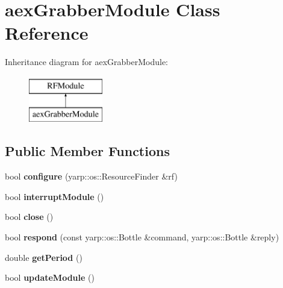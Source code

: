 \hypertarget{classaexGrabberModule}{\section{aex\-Grabber\-Module Class Reference}
\label{classaexGrabberModule}
}
Inheritance diagram for aex\-Grabber\-Module\-:\begin{figure}[H]
\begin{center}
\leavevmode
\includegraphics[height=2.000000cm]{classaexGrabberModule}
\end{center}
\end{figure}
\subsection*{Public Member Functions}
\begin{DoxyCompactItemize}
\item 
\hypertarget{classaexGrabberModule_a7654bd490ccdd31ffc5de4e5d85789f3}{bool {\bfseries configure} (yarp\-::os\-::\-Resource\-Finder \&rf)}\label{classaexGrabberModule_a7654bd490ccdd31ffc5de4e5d85789f3}

\item 
\hypertarget{classaexGrabberModule_a349f07e43758979d9f7e520dd25ba868}{bool {\bfseries interrupt\-Module} ()}\label{classaexGrabberModule_a349f07e43758979d9f7e520dd25ba868}

\item 
\hypertarget{classaexGrabberModule_ac032595742ec7bfdd3d6788436572aca}{bool {\bfseries close} ()}\label{classaexGrabberModule_ac032595742ec7bfdd3d6788436572aca}

\item 
\hypertarget{classaexGrabberModule_a18cadf0f324c5dbb7a8d9acfb767ffc0}{bool {\bfseries respond} (const yarp\-::os\-::\-Bottle \&command, yarp\-::os\-::\-Bottle \&reply)}\label{classaexGrabberModule_a18cadf0f324c5dbb7a8d9acfb767ffc0}

\item 
\hypertarget{classaexGrabberModule_a06d7548efce14fbb37945f5640ca029a}{double {\bfseries get\-Period} ()}\label{classaexGrabberModule_a06d7548efce14fbb37945f5640ca029a}

\item 
\hypertarget{classaexGrabberModule_ae08d72931d6f5283092228dab867d92e}{bool {\bfseries update\-Module} ()}\label{classaexGrabberModule_ae08d72931d6f5283092228dab867d92e}

\end{DoxyCompactItemize}


